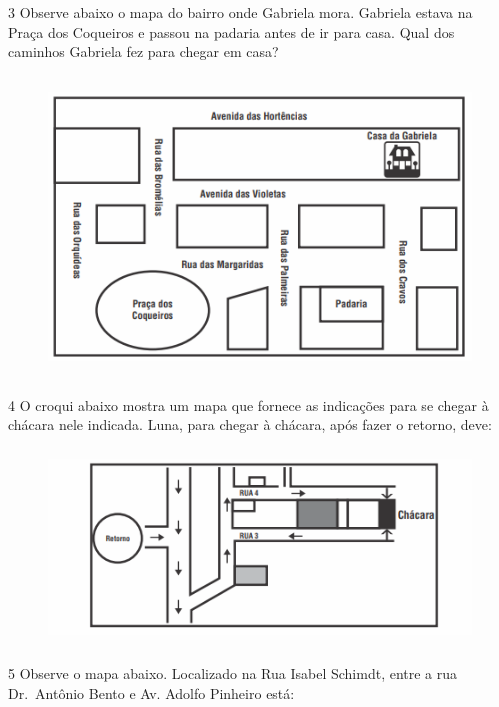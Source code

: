 
\num{3}  Observe abaixo o mapa do bairro onde Gabriela mora. Gabriela estava na Praça dos Coqueiros e passou na padaria antes de ir
para casa. Qual dos caminhos Gabriela fez para chegar em casa?

\begin{figure}[h]
\centering\includegraphics[width=4.95347in,height=3.13958in]{./imgSAEB_6_MAT/media/image66.png}
\end{figure}


\num{4}  O croqui abaixo mostra um mapa que fornece as indicações para se
chegar à chácara nele indicada. Luna, para chegar à chácara, após fazer o retorno, deve:

\begin{figure}[h]
\centering\includegraphics[width=4.95347in,height=2.04653in]{./imgSAEB_6_MAT/media/image67.png}
\end{figure}


\num{5}  Observe o mapa abaixo. Localizado na Rua Isabel Schimdt, entre a rua Dr.~Antônio Bento e Av.
Adolfo Pinheiro está:

